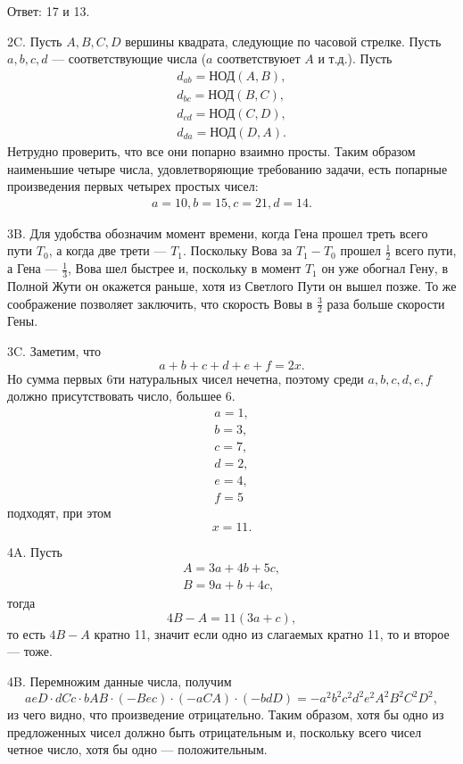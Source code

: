 \documentclass[12pt]{amsart}
\theoremstyle{definition}
\theoremstyle{remark}
\theoremstyle{plain}
\begin{document}
Ответ: 17 и 13.

2C. Пусть $A,B,C,D$ вершины квадрата, следующие по часовой стрелке. Пусть $a,b,c,d$ --- соответствующие числа ($a$ соответствуюет $A$ и т.д.). Пусть
$$\begin{array}{l}
d_{ab}=\text{НОД}(A,B),\\
d_{bc}=\text{НОД}(B,C),\\
d_{cd}=\text{НОД}(C,D),\\
d_{da}=\text{НОД}(D,A).
\end{array}
$$
Нетрудно проверить, что все они попарно взаимно просты. Таким образом наименьшие четыре числа, удовлетворяющие требованию задачи, есть попарные произведения первых четырех простых чисел:
$$
\begin{array}{l}
a=10,
b=15,
c=21,
d=14.
\end{array}
$$

3B. Для удобства обозначим момент времени, когда Гена прошел треть всего пути $T_0$, а когда две трети --- $T_1$. Поскольку Вова за $T_1-T_0$ прошел $\frac{1}{2}$ всего пути, а Гена --- $\frac{1}{3}$, Вова шел быстрее и, поскольку в момент $T_1$ он уже обогнал Гену, в Полной Жути он окажется раньше, хотя из Светлого Пути он вышел позже. То же соображение позволяет заключить, что скорость Вовы в $\frac{3}{2}$ раза больше скорости Гены.

3C. Заметим, что
$$
a+b+c+d+e+f=2x.
$$
Но сумма первых 6ти натуральных чисел нечетна, поэтому среди $a,b,c,d,e,f$ должно присутствовать число, большее 6.
$$
\begin{array}{l}
a=1,\\
b=3,\\
c=7,\\
d=2,\\
e=4,\\
f=5
\end{array}
$$
подходят, при этом
$$
x=11.
$$

4A. Пусть
$$\begin{array}{l}
A=3a+4b+5c,\\
B=9a+b+4c,
\end{array}$$
тогда
$$
4B-A=11(3a+c),
$$
то есть $4B-A$ кратно 11, значит если одно из слагаемых кратно 11, то и второе --- тоже.


4B. Перемножим данные числа, получим
$$
aeD\cdot dCc\cdot bAB\cdot (-Bec)\cdot (-aCA)\cdot (-bdD)=-a^2b^2c^2d^2e^2A^2B^2C^2D^2,
$$
из чего видно, что произведение отрицательно. Таким образом, хотя бы одно из предложенных чисел должно быть отрицательным и, поскольку всего чисел четное число, хотя бы одно --- положительным.
\end{document}
